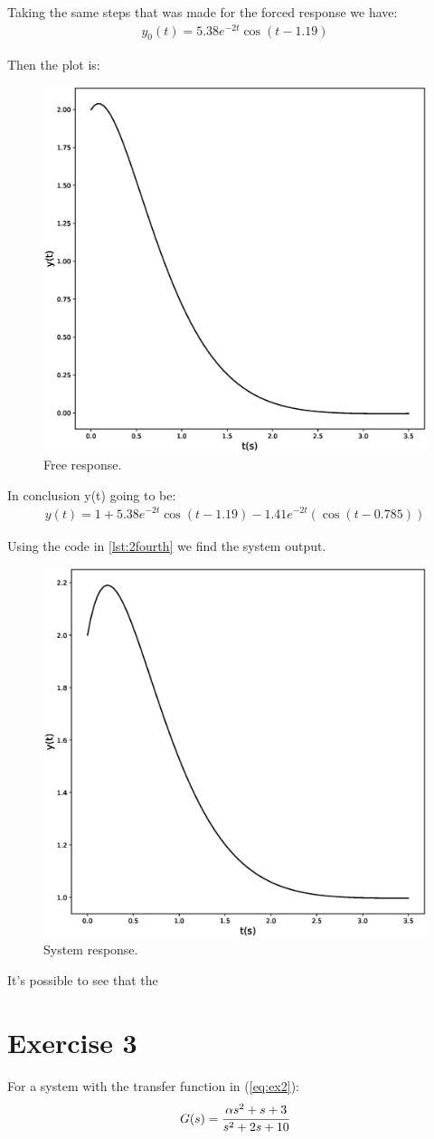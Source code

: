 \documentclass[a4paper,11pt]{article}
\begin{document}
\par Taking the same steps that was made for the forced response we have:
\begin{align*}
y_0(t) =5.38e^{-2t}\cos(t-1.19)
\end{align*}
\par Then the plot is:
\begin{figure}[H]
\centering
\includegraphics[width = 0.4\columnwidth]{Figures/Question2/Free.eps}
\caption{Free response.}
\end{figure}
\par In conclusion y(t) going to be:
\begin{align}
y(t) = 1+5.38e^{-2t}\cos(t-1.19)-1.41e^{-2t}(\cos(t-0.785))
\end{align}
\par Using the code in \ref{lst:2fourth} we find the system output.
\begin{figure}[H]
\centering
\includegraphics[width=0.4\columnwidth]{Figures/Question2/System.eps}
\caption{System response.}
\end{figure}
\par It's possible to see that the
\section*{Exercise 3}

\noindent  For a system with the transfer function in (\ref{eq:ex2}):
\begin{equation}
G(s)=\cfrac{\alpha s^2 +s+3}{s^2+2s+10}
\label{eq:ex2}
\end{equation}  
\end{document}
